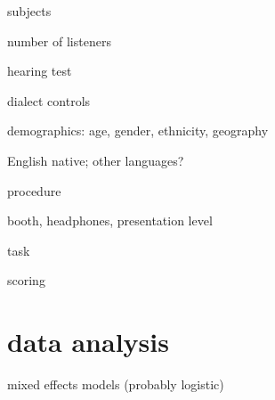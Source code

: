 \begin{itm}
	\item{subjects}
	\begin{itm}
		\item{number of listeners}
		\item{hearing test}
		\item{dialect controls}
		\item{demographics: age, gender, ethnicity, geography}
		\item{English native; other languages?}
	\end{itm}
	\item{procedure}
	\begin{itm}
		\item{booth, headphones, presentation level}
		\item{task}
		\item{scoring}
	\end{itm}
\end{itm}

\section{data analysis}
\begin{itm}
	\item{mixed effects models (probably logistic)}
\end{itm}
